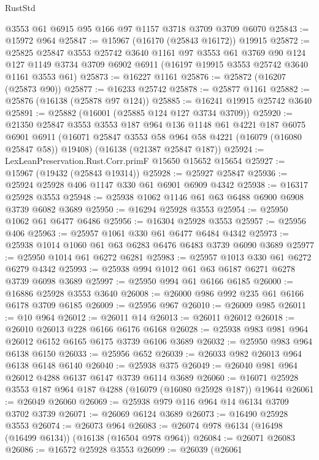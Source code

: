 \begin{lexlean}{RustStd}
\begin{coremodule}
    @3553
    @61
    @6915
    @95
    @166
    @97
    @1157
    @3718
    @3709
    @3709
    @6070
@25843 := @15972 @964
@25847 := @15967 (@16170 (@25843 @16172)) @19915
@25872 := @25825
    @25847
    @3553
    @25742
    @3640
    @1161
    @97
    @3553
    @61
    @3769
    @90
    @124
    @127
    @1149
    @3734
    @3709
    @6902
    @6911
    (@16197 @19915 @3553 @25742 @3640 @1161 @3553 @61)
@25873 := @16227 @1161
@25876 := @25872 (@16207 (@25873 @90))
@25877 := @16233 @25742
@25878 := @25877 @1161
@25882 := @25876 (@16138 (@25878 @97 @124))
@25885 := @16241 @19915 @25742 @3640
@25891 := @25882 (@16001 (@25885 @124 @127 @3734 @3709))
@25920 := @21350
    @25847
    @3553
    @3553
    @187
    @964
    @136
    @1148
    @61
    @4221
    @187
    @6075
    @6901
    @6911
    (@16071 @25847 @3553 @58 @964 @58 @4221 (@16079 (@16080 @25847 @58)) @19408)
    (@16138 (@21387 @25847 @187))
@25924 := LexLeanPreservation.Rust.Corr.primF @15650 @15652 @15654
@25927 := @15967 (@19432 (@25843 @19314))
@25928 := @25927 @25847
@25936 := @25924 @25928 @406 @1147 @330 @61 @6901 @6909 @4342
@25938 := @16317 @25928 @3553
@25948 := @25938 @1062 @1146 @61 @63 @6488 @6900 @6908 @3739 @6082 @3689
@25950 := @16294 @25928 @3553
@25954 := @25950 @1062 @61 @6477 @6486
@25956 := @16304 @25928 @3553
@25957 := @25956 @406
@25963 := @25957 @1061 @330 @61 @6477 @6484 @4342
@25973 := @25938 @1014 @1060 @61 @63 @6283 @6476 @6483 @3739 @6090 @3689
@25977 := @25950 @1014 @61 @6272 @6281
@25983 := @25957 @1013 @330 @61 @6272 @6279 @4342
@25993 := @25938 @994 @1012 @61 @63 @6187 @6271 @6278 @3739 @6098 @3689
@25997 := @25950 @994 @61 @6166 @6185
@26000 := @16886 @25928 @3553 @3640
@26008 := @26000 @986 @992 @235 @61 @6166 @6178 @3709 @6185
@26009 := @25956 @967
@26010 := @26009 @985
@26011 := @10 @964
@26012 := @26011 @14
@26013 := @26011 @26012
@26018 := @26010 @26013 @228 @6166 @6176 @6168
@26028 := @25938 @983 @981 @964 @26012 @6152 @6165 @6175 @3739 @6106 @3689
@26032 := @25950 @983 @964 @6138 @6150
@26033 := @25956 @652
@26039 := @26033 @982 @26013 @964 @6138 @6148 @6140
@26040 := @25938 @375
@26049 := @26040 @981 @964 @26012 @4288 @6137 @6147 @3739 @6114 @3689
@26060 := @16071 @25928 @3553 @187 @964 @187 @4288 (@16079 (@16080 @25928 @187)) @19644
@26061 := @26049 @26060
@26069 := @25938 @979 @116 @964 @14 @6134 @3709 @3702 @3739
@26071 := @26069 @6124 @3689
@26073 := @16490 @25928 @3553
@26074 := @26073 @964
@26083 := @26074 @978 @6134 (@16498 (@16499 @6134)) (@16138 (@16504 @978 @964))
@26084 := @26071 @26083
@26086 := @16572 @25928 @3553
@26099 := @26039
    (@26061

\end{coremodule}
\end{lexlean}
